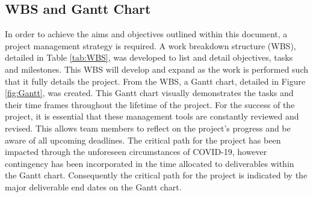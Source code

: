 \begin{appendices}
\section{WBS and Gantt Chart}
\label{app_WBS&gantt}
In order to achieve the aims and objectives outlined within this document, a project management strategy is required. A work breakdown structure (WBS), detailed in Table \ref{tab:WBS}, was developed to list and detail objectives, tasks and milestones. This WBS will develop and expand as the work is performed such that it fully details the project. From the WBS, a Gantt chart, detailed in Figure \ref{fig:Gantt}, was created. This Gantt chart visually demonstrates the tasks and their time frames throughout the lifetime of the project. For the success of the project, it is essential that these management tools are constantly reviewed and revised. This allows team members to reflect on the project's progress and be aware of all upcoming deadlines. The critical path for the project has been impacted through the unforeseen circumstances of COVID-19, however contingency has been incorporated in the time allocated to deliverables within the Gantt chart. Consequently the critical path for the project is indicated by the major deliverable end dates on the Gantt  chart.  \\

\newpage 

\begin{landscape}
\pagestyle{empty}

\scriptsize





\end{landscape}
\restoregeometry
\clearpage

\normalsize




\begin{landscape}


\end{landscape}
\end{appendices}
